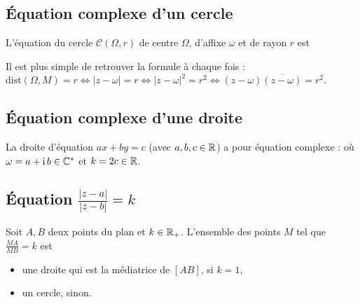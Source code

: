 \documentclass[10pt,class=article,crop=false]{standalone}
\begin{document}
\begin{multicols}{2}
\subsection{\'Equation complexe d'un cercle}

L'équation du cercle $\mathcal{C}(\Omega,r)$ de centre $\Omega$, d'affixe $\omega$ et de rayon $r$ est

Il est plus simple de retrouver la formule à chaque fois :
$\mathrm{dist}(\Omega,M) = r \iff  |z-\omega|=r \iff |z-\omega|^2=r^2 \iff (z-\omega)\overline{(z-\omega)}=r^2$.



\subsection{\'Equation complexe d'une droite}

La droite d'équation $ax+by=c$ (avec $a,b,c \in \mathbb{R}$) a pour équation complexe :
où $\omega = a+\operatorname{i}  b \in \mathbb{C}^*$ et $k=2c \in \mathbb{R}$.

\subsection{\'Equation $\frac{|z-a|}{|z-b|}=k$}

\begin{proposition}
	Soit $A,B$ deux points du plan et $k\in \mathbb{R}_+$.
	L'ensemble des points $M$ tel que $\frac{MA}{MB}=k$
	est
	\begin{itemize}
		\item une droite qui est la médiatrice de $[AB]$, si $k=1$,
		\item un cercle, sinon.
	\end{itemize}
\end{proposition}




\end{multicols}
\end{document}

